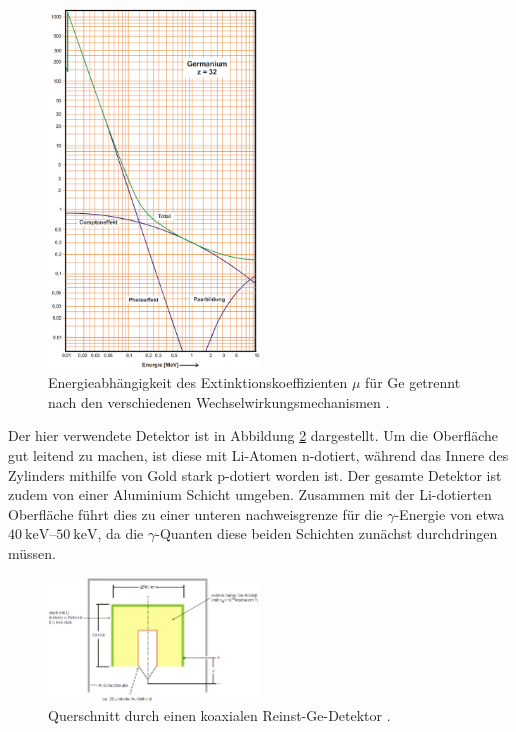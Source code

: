 \begin{figure}
	\centering
	\includegraphics[width = 0.5\textwidth]{pic/german.png}
	\caption{Energieabhängigkeit des Extinktionskoeffizienten $\mu$ für Ge getrennt nach den verschiedenen Wechselwirkungsmechanismen \cite{anleitung}.}
	\label{german}
\end{figure}

Der hier verwendete Detektor ist in Abbildung \ref{detekt} dargestellt.
Um die Oberfläche gut leitend zu machen, ist diese mit Li-Atomen n-dotiert, während das Innere des Zylinders mithilfe von Gold stark p-dotiert worden ist.
Der gesamte Detektor ist zudem von einer Aluminium Schicht umgeben.
Zusammen mit der Li-dotierten Oberfläche führt dies zu einer unteren nachweisgrenze für die $\gamma$-Energie von etwa $\SIrange{40}{50}{\kilo\electronvolt}$, da die $\gamma$-Quanten diese beiden Schichten zunächst durchdringen müssen.

\begin{figure}
	\centering
	\includegraphics[width = 0.5\textwidth]{pic/detekt.png}
	\caption{Querschnitt durch einen koaxialen Reinst-Ge-Detektor \cite{anleitung}.}
	\label{detekt}
\end{figure}

